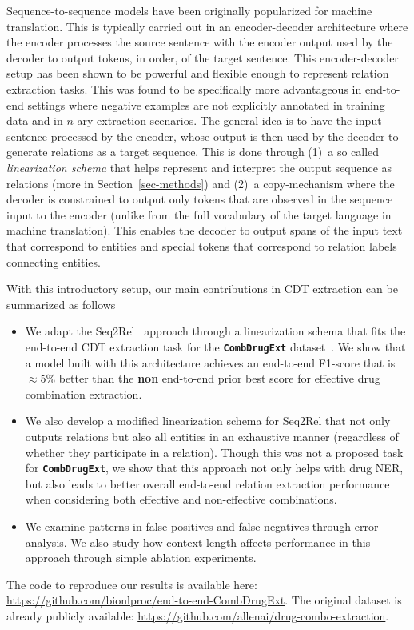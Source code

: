 \documentclass[conference]{IEEEtran}
\begin{document}
Sequence-to-sequence models have been originally popularized for machine translation. This is typically carried out in an encoder-decoder  architecture where the encoder processes the source sentence with the encoder output used by the decoder to output tokens, in order, of the target sentence. This encoder-decoder setup has been shown to be powerful and flexible enough to represent relation extraction tasks. This was found to be specifically more advantageous in end-to-end settings where negative examples are not explicitly annotated in training data and in $n$-ary extraction scenarios. The general idea is to have the input sentence processed by the encoder, whose output is then used by the decoder to generate relations as a target sequence.
This is done through (1)~a so called \textit{linearization schema} that helps  represent and interpret the output sequence as relations (more in Section~\ref{sec-methods}) and (2)~a copy-mechanism where the decoder is constrained to output only tokens that are observed in the sequence input to the encoder (unlike from the full vocabulary of the target language in  machine translation). This enables the decoder to output spans of the input text that correspond to entities and special tokens that correspond to relation labels connecting entities. 

With this introductory setup, our main contributions in CDT extraction can be summarized as follows 
\begin{itemize}
\item We adapt the Seq2Rel~\cite{giorgi-etal-2022-sequence} approach through a  linearization schema that fits the end-to-end CDT extraction task  for the \textbf{\texttt{CombDrugExt}} dataset~\cite{tiktinsky-etal-2022-dataset}. We show that a model built with this architecture achieves an end-to-end F1-score that is $\approx  5\%$ better than the \textbf{non} end-to-end prior best score for effective drug combination extraction. 
\item We also develop a modified linearization schema for Seq2Rel that not only outputs relations but also all entities in an exhaustive manner (regardless of whether they participate in a relation). Though this was not a proposed task for \textbf{\texttt{CombDrugExt}}, we show that this approach not only helps with drug NER, but also leads to better  overall end-to-end relation extraction performance  when considering both effective and non-effective combinations. 
\item We examine patterns in   false positives and false negatives through error analysis. We also study how context length affects performance in this approach through simple ablation experiments. 
\end{itemize}
The code to  reproduce our results is available here: \url{https://github.com/bionlproc/end-to-end-CombDrugExt}. The original dataset is already publicly available: \url{https://github.com/allenai/drug-combo-extraction}.
\end{document}

